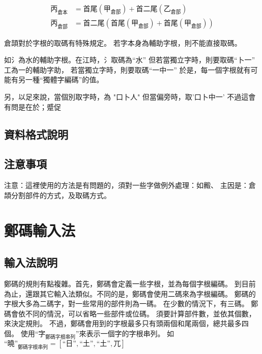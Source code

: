 \documentclass{article}
\begin{document}
\begin{subequations}
  \begin{align}
  \mbox{丙}_{\mbox{倉本}}&=\mbox{首尾}(\mbox{甲}_{\mbox{倉部}})
      + \mbox{首二尾}({\mbox{乙}_{\mbox{倉部}}})\\
  \mbox{丙}_{\mbox{倉部}}&= \mbox{首二尾}(
      \mbox{首尾}(\mbox{甲}_{\mbox{倉部}})
      + \mbox{首尾}(\mbox{甲}_{\mbox{倉部}})
      )
  \end{align}
\end{subequations}

倉頡對於字根的取碼有特殊規定。
若字本身為輔助字根，則不能直接取碼。

如氵為水的輔助字根。在江時，氵取碼為``水''
但若當獨立字時，則要取碼``卜一''
工為一的輔助字助，
若當獨立字時，則要取碼``一中一''
於是，每一個字根就有可能有另一種``獨體字編碼''的值。

另，以足來說，當個別取字時，為 "口卜人"
但當偏旁時，取'口卜中一'
不過這會有問是在於；蹙促

\subsection{資料格式說明}
\subsection{注意事項}
{\LARGE
注意：這裡使用的方法是有問題的，須對一些字做例外處理：如毈、
主因是：倉頡分割部件的方式，及取碼方式。
}\\

\section{鄭碼輸入法}
\subsection{輸入法說明}
鄭碼的規則有點複雜。首先，鄭碼會定義一些字根，並為每個字根編碼。
到目前為止，還跟其它輸入法類似。不同的是，鄭碼會使用二碼來為字根編碼。
鄭碼的字根大多為二碼字，對一些常用的部件則為一碼。
在少數的情況下，有三碼。
鄭碼會依不同的情況，可以省略一些部件或位碼。
須要計算部件數，並依其個數，來決定規則。
不過，鄭碼會用到的字根最多只有頭兩個和尾兩個，總共最多四個。
使用``$\mbox{字}_{\mbox{鄭碼字根串列}}$''來表示一個字的字根串列。
如$\mbox{``曉''}_{\mbox{鄭碼字根串列}}=[\mbox{``日''}, \mbox{``土''}, \mbox{``土''}, \mbox{兀}]$\\
\end{document}
